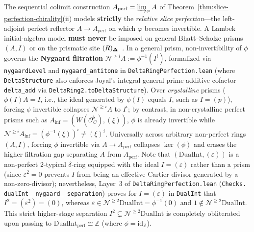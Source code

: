 \begin{remark}\label{rem:guardrail-2}%
%
%
The sequential colimit construction $A_{\mathrm{perf}} = \varinjlim_\varphi A$ of Theorem~\ref{thm:slice-perfection-chirality}(ii) models \textbf{strictly} the \emph{relative slice perfection}---the left-adjoint perfect reflector $A \to A_{\mathrm{perf}}$ on which $\varphi$ becomes invertible. A Lambek initial-algebra model \textbf{must never} be imposed on general Bhatt--Scholze prisms $(A, I)$ or on the prismatic site $(R)_{\mathbf{\Delta}}$~\cite[\S\S 2--3, \S 12]{BhattScholze22}. In a general prism, non-invertibility of $\phi$ governs the \textbf{Nygaard filtration} $\mathcal{N}^{\ge i} A := \phi^{-1}(I^i)$, formalized via \texttt{nygaardLevel} and \texttt{nygaard\_antitone} in \texttt{DeltaRingPerfection.lean} (where \texttt{DeltaStructure} also enforces Joyal's integral general-prime additive cofactor \texttt{delta\_add} via \texttt{DeltaRing2.toDeltaStructure}). Over \emph{crystalline} prisms ($\phi(I)A = I$, i.e., the ideal generated by $\phi(I)$ equals $I$, such as $I = (p)$), forcing $\phi$ invertible collapses $\mathcal{N}^{\ge i} A$ to $I^i$; by contrast, in non-crystalline perfect prisms such as $A_{\mathrm{inf}} = (W(\mathcal{O}_C^\flat), (\xi))$, $\phi$ is already invertible while $\mathcal{N}^{\ge i} A_{\mathrm{inf}} = (\phi^{-1}(\xi))^i \neq (\xi)^i$. Universally across arbitrary non-perfect rings $(A, I)$, forcing $\phi$ invertible via $A \to A_{\mathrm{perf}}$ collapses $\ker(\phi)$ and erases the higher filtration gap separating $A$ from $A_{\mathrm{perf}}$. Note that $(\mathrm{DualInt}, (\varepsilon))$ is a non-perfect $2$-typical $\delta$-ring equipped with the ideal $I = (\varepsilon)$ rather than a prism (since $\varepsilon^2 = 0$ prevents $I$ from being an effective Cartier divisor generated by a non-zero-divisor); nevertheless, Layer~3 of \texttt{DeltaRingPerfection.lean} (\texttt{Checks. dualInt\_ nygaard\_ separation}) proves for $I = (\varepsilon)$ in \texttt{DualInt} that $I^2 = (\varepsilon^2) = (0)$, whereas $\varepsilon \in \mathcal{N}^{\ge 2}\mathrm{DualInt} = \phi^{-1}(0)$ and $1 \notin \mathcal{N}^{\ge 2}\mathrm{DualInt}$. This strict higher-stage separation $I^2 \subsetneq \mathcal{N}^{\ge 2}\mathrm{DualInt}$ is completely obliterated upon passing to $\mathrm{DualInt}_{\mathrm{perf}} \cong \mathbb{Z}$ (where $\phi = \mathrm{id}_{\mathbb{Z}}$).
\end{remark}

